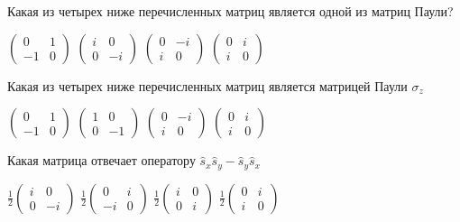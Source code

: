 \documentclass[11pt,a4paper]{exam}
\begin{document}
\begin{questions}
\question Какая из четырех ниже перечисленных матриц является одной из матриц Паули?
\begin{choices}
\choice $\left( {\begin{array}{*{20}{c}}
0&1\\
{ - 1}&0
\end{array}} \right)$      
\choice $\left( {\begin{array}{*{20}{c}}
i&0\\
0&{ - i}
\end{array}} \right)$      
\choice $\left( {\begin{array}{*{20}{c}}
0&{ - i}\\
i&0
\end{array}} \right)$      
\choice $\left( {\begin{array}{*{20}{c}}
0&i\\
i&0
\end{array}} \right)$
\end{choices}

\question Какая из четырех ниже перечисленных матриц является матрицей Паули ${\sigma _z}$
\begin{choices}
\choice $\left( {\begin{array}{*{20}{c}}
0&1\\
{ - 1}&0
\end{array}} \right)$      
\choice $\left( {\begin{array}{*{20}{c}}
1&0\\
0&{ - 1}
\end{array}} \right)$      
\choice $\left( {\begin{array}{*{20}{c}}
0&{ - i}\\
i&0
\end{array}} \right)$      
\choice $\left( {\begin{array}{*{20}{c}}
0&i\\
i&0
\end{array}} \right)$
\end{choices}

\question Какая матрица отвечает оператору ${\hat s_x}{\hat s_y} - {\hat s_y}{\hat s_x}$
\begin{choices}
\choice $\frac{1}{2}\left( {\begin{array}{*{20}{c}}
i&0\\
0&{ - i}
\end{array}} \right)$      
\choice $\frac{1}{2}\left( {\begin{array}{*{20}{c}}
0&i\\
{ - i}&0
\end{array}} \right)$      
\choice $\frac{1}{2}\left( {\begin{array}{*{20}{c}}
i&0\\
0&i
\end{array}} \right)$      
\choice $\frac{1}{2}\left( {\begin{array}{*{20}{c}}
0&i\\
i&0
\end{array}} \right)$
\end{choices}


\end{questions}
\end{document}

